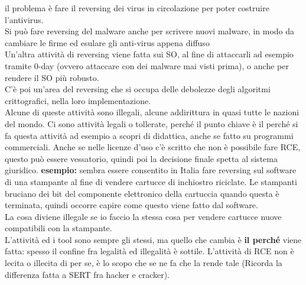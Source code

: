 \documentclass[12pt, oneside]{extbook}
\begin{document}
il problema è fare il reversing dei virus in circolazione per poter costruire l'antivirus.\\ Si può fare reversing del malware anche per scrivere nuovi malware, in modo da cambiare le firme ed esulare gli anti-virus appena diffuso\\ Un'altra attività di reversing viene fatta sui SO, al fine di attaccarli ad esempio tramite 0-day (ovvero attaccare con dei malware mai visti prima), o anche per rendere il SO più robusto.\\ C'è poi un'area del reversing che si occupa delle debolezze degli algoritmi crittografici, nella loro implementazione.\\ Alcune di queste attività sono illegali, alcune addirittura in quasi tutte le nazioni del mondo. Ci sono attività  legali o tollerate, perché il punto chiave è il perché si fa questa attività ad esempio a scopri di didattica, anche se fatto su programmi commerciali. Anche se nelle licenze d'uso c'è scritto che non è possibile fare RCE, questo può essere vessatorio, quindi poi la decisione finale spetta al sistema giuridico. \textbf{esempio:} sembra essere consentito in Italia fare reversing sul software di una stampante al fine di vendere cartucce di inchiostro riciclate. Le stampanti bruciano dei bit del componente elettronico della cartuccia quando questa è terminata, quindi occorre capire come questo viene fatto dal software.\\ La cosa diviene illegale se io faccio la stessa cosa per vendere cartucce nuove compatibili con la stampante.\\ L'attività ed i tool sono sempre gli stessi, ma quello che cambia è \textbf{il perché} viene fatta: spesso il confine fra legalità ed illegalità è sottile. L'attività di RCE non è lecita o illecita di per se, è lo scopo che se ne fa che la rende tale (Ricorda la differenza fatta a SERT fra hacker e cracker).
\end{document}
